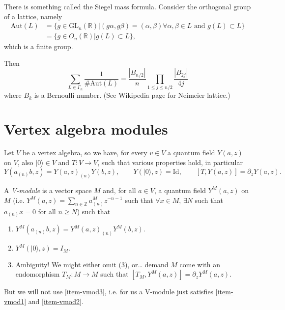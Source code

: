 \medskip\noindent
There is something called the Siegel mass
formula.
Consider the orthogonal group of a lattice,
namely
$$
\begin{aligned}
\text{Aut}(L)&=\{g \in
\text{GL}_n(\mathbb{R})
|(g \alpha,g \beta)=(\alpha,\beta)\forall
\alpha,\beta \in L\text{ and }
g(L) \subset L\}\\
&=\{g \in O_n(\mathbb{R})|g(L) \subset L\},
\end{aligned}
$$
which is a finite group.

Then
$$
\sum_{L \in \Gamma_n}\frac{1}{\#
\text{Aut}(L)}
=\frac{|B_{n/2}|}{n}
\prod_{1 \leq j \leq  n/2}\frac{|B_{2j}|}{4j}
$$
where $B_k$ is a Bernoulli number.
(See Wikipedia page for Neimeier lattice.)



\section{Vertex algebra modules}
\label{section-vertex-algebra-modules}

\noindent
Let $V$ be a vertex algebra, so we have,
for every $v \in V$ a quantum field
$Y(a,z)$ on $V$, also $|0\rangle \in V$
and $T:V \to V$,
such that various properties hold,
in particular
$$
Y(a_{(n)}b,z)=Y(a,z)_{(n)}Y(b,z),\qquad
Y(|0\rangle,z)=\text{Id},
\qquad [T,Y(a,z)]=\partial_zY(a,z).
$$

\begin{definition}
\label{definition-v-module}
A {\it V-module} is a vector space $M$ and,
for all $a \in V$, a quantum field $Y^M(a,z)$
on $M$
(i.e. $Y^M(a,z)=\sum_{n \in
\mathbb{Z}}a^M_{(n)}z^{-n-1}$
such that $\forall x \in M$, $\exists N$
such that $a_{(n)}x=0$ for all $n \geq N$)
such that
\begin{enumerate}
\item
$Y^M(a_{(n)}b,z)=Y^M(a,z)_{(n)}Y^M(b,z)$.
\label{item-vmod1}

\item $Y^M(|0\rangle,z)=I_M$.
\label{item-vmod2}

\item
\label{item-vmod3}
Ambiguity! We might either omit (3), or…
demand $M$ come with an endomorphism $T_M:M
\to M$ such that
$[T_M,Y^M(a,z)]=\partial_z Y^M(a,z)$.
\end{enumerate}
\end{definition}

But we will not use \ref{item-vmod3}, i.e.
for us a V-module just satisfies
\ref{item-vmod1} and \ref{item-vmod2}.

